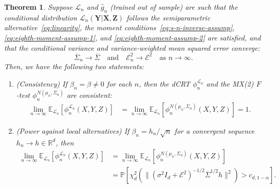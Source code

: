 \documentclass[12pt]{article}
\newtheorem{theorem}{Theorem}
\theoremstyle{definition}
\theoremstyle{remark}
\newcommand{\prx}{\bm X}
\newcommand{\srx}{X}
\newcommand{\prz}{\bm Z}
\newcommand{\srz}{Z}
\newcommand{\pry}{{\bm Y}}
\newcommand{\sry}{Y}
\begin{document}
\begin{theorem}  \label{thm:power}
Suppose $\mathcal L_n$ and $\widehat g_n$ (trained out of sample) are such that the conditional distribution $\mathcal L_n(\pry|\prx, \prz)$ follows the semiparametric alternative~\eqref{eq:linearity}, the moment conditions~\eqref{eq:s-n-inverse-assump}, \eqref{eq:eighth-moment-assump-1}, and \eqref{eq:eighth-moment-assump-2} are satisfied, and that the conditional variance and variance-weighted mean squared error converge:
\begin{equation}
	\overline \Sigma_n \rightarrow \overline{\Sigma} \quad \text{and} \quad \mathcal E_n^2 \rightarrow \mathcal E^2 \quad \text{as } n \rightarrow \infty.
	\label{eq:limits}
\end{equation}
Then, we have the following two statements:
\begin{enumerate}
\item[(a)] (Consistency) If $\beta_n = \beta \neq 0$ for each $n$, then the dCRT $\phi_n^{\mathcal L_n}$ and the MX(2) $F$-test $\phi_n^{N(\mu_n, \Sigma_n)}$ are consistent:
\begin{equation}
	\begin{split}
		\lim_{n \rightarrow \infty} \mathbb E_{\mathcal L_n}\left[\phi_n^{\mathcal L_n}(\srx, \sry, \srz)\right] &= \lim_{n \rightarrow \infty} \mathbb E_{\mathcal L_n}\left[\phi_n^{N(\mu_n, \Sigma_n)}(\srx, \sry, \srz)\right] = 1.
		\label{eq:consistency}
	\end{split}
\end{equation}
\item[(b)] (Power against local alternatives) If $\beta_n = h_n/\sqrt{n}$ for a convergent sequence ${h_n \rightarrow h \in \mathbb R^d}$, then
\begin{equation}
	\begin{split}
			\lim_{n \rightarrow \infty} \mathbb E_{\mathcal L_n}\left[\phi_n^{\mathcal L_n}(\srx, \sry, \srz)\right] &= \lim_{n \rightarrow \infty} \mathbb E_{\mathcal L_n}\left[\phi_n^{N(\mu_n, \Sigma_n)}(\srx, \sry, \srz)\right] \\
		&= \mathbb P[\chi^2_d(\|(\sigma^2I_d +\mathcal E^2)^{-1/2}\overline \Sigma^{1/2} h\|^2) > c_{d,1-\alpha}].
		\label{eq:main-conclusion}
	\end{split}
\end{equation}
\end{enumerate}
\end{theorem}
\end{document}
